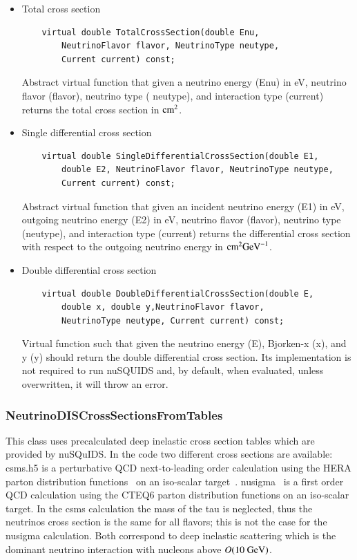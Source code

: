 \documentclass[3p,12pt]{elsarticle}
\newcommand{\ttf}{\ttfamily}
\begin{document}
\begin{itemize}
  \item Total cross section
  \begin{lstlisting}
    virtual double TotalCrossSection(double Enu,
    	NeutrinoFlavor flavor, NeutrinoType neutype,
    	Current current) const;
  \end{lstlisting}
  Abstract virtual function that given a neutrino energy ({\ttf Enu})
    in eV, neutrino flavor ({\ttf flavor}), neutrino type ({\ttf
    neutype}), and interaction type ({\ttf current}) returns the 
  total cross section in ${\rm cm}^2$.
  \item Single differential cross section
  \begin{lstlisting}
    virtual double SingleDifferentialCrossSection(double E1,
        double E2, NeutrinoFlavor flavor, NeutrinoType neutype,
    	Current current) const;
  \end{lstlisting}
  Abstract virtual function that given an incident neutrino energy
  ({\ttf E1}) in eV, outgoing neutrino energy ({\ttf E2}) in eV,
    neutrino flavor ({\ttf flavor}), neutrino type ({\ttf neutype}), and
  interaction type ({\ttf current}) returns the differential cross
  section with respect to the outgoing neutrino energy in ${\rm
    cm}^2{\rm GeV}^{-1}$.  
  \item Double differential cross section
  \begin{lstlisting}
    virtual double DoubleDifferentialCrossSection(double E, 
        double x, double y,NeutrinoFlavor flavor,
        NeutrinoType neutype, Current current) const;
  \end{lstlisting}
  Virtual function such that given the neutrino energy ({\ttf E}),
  Bjorken-x ({\ttf x}), and y ({\ttf y}) should return the double
   differential cross section. Its implementation is not required to
   run {\ttf nuSQUIDS} and, by default, when evaluated, unless
   overwritten, it will throw an error. 
\end{itemize}

\subsubsection{NeutrinoDISCrossSectionsFromTables\label{sec:neutrino_cross_section_from_tables}}

This class uses precalculated deep inelastic cross section tables
which are provided by {\ttf nuSQuIDS}.
In the code two different cross sections are available:
{\ttf csms.h5} is a perturbative QCD next-to-leading order calculation using the HERA
parton distribution functions~\cite{Chekanov:2002pv} on an iso-scalar
target~\cite{CooperSarkar:2011pa}. {\ttf nusigma}~\cite{nusigma} is a first order QCD
calculation using the {\ttf CTEQ6} parton distribution functions on an
iso-scalar target. In the {\ttf csms} calculation the mass of the tau
is neglected, thus the neutrinos cross section is the same for all
flavors; this is not the case for the {\ttf nusigma} calculation.
Both correspond to deep inelastic scattering which is the dominant
neutrino interaction with nucleons above $O({\rm 10~GeV})$. 
\end{document}
